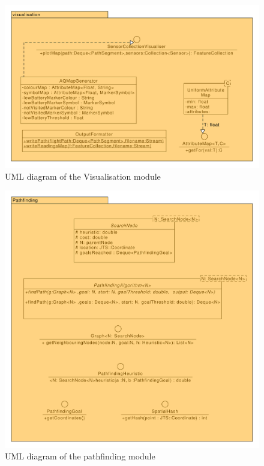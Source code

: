 \documentclass[10pt,a4paper]{article}
\begin{document}
\begin{figure}[H]
    \centering
    \includegraphics[width=\columnwidth]{diagrams/visualisation.uxf.pdf}
    \caption{UML diagram of the Visualisation module}
    \label{fig:visualisation}
\end{figure}
\begin{figure}[H]
    \centering
    \includegraphics[width=\columnwidth]{diagrams/pathfinding.uxf.pdf}
    \caption{UML diagram of the pathfinding module}
    \label{fig:pathfinding}
\end{figure}
\end{document}

